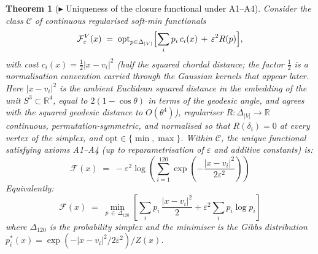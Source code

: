 \documentclass[12pt]{article}
\newtheorem{theorem}{Theorem}
\newcommand{\Fcal}{\mathcal{F}}
\begin{document}
\begin{theorem}[$\blacktriangleright$ Uniqueness of the closure functional under A1--A4]\label{thm:F}
Consider the class $\mathcal{C}$ of continuous regularised soft-min
functionals
\begin{equation}\label{eq:softmin_class}
    \Fcal_\varepsilon^V(x) \;=\; \mathrm{opt}_{p \in \Delta_{|V|}}
    \Bigl[\sum_i p_i\,c_i(x) \,+\, \varepsilon^2 R(p)\Bigr],
\end{equation}
with cost $c_i(x) = \tfrac{1}{2}|x - v_i|^2$ (half the squared chordal distance; the factor $\tfrac{1}{2}$ is a normalisation convention carried through the Gaussian kernels that appear later. Here $|x - v_i|^2$ is the ambient Euclidean squared distance in the embedding of the unit $S^3 \subset \mathbb{R}^4$, equal to $2(1-\cos\theta)$ in terms of the geodesic angle, and agrees with the squared geodesic distance to $O(\theta^4)$), regulariser $R :
\Delta_{|V|} \to \mathbb{R}$ continuous, permutation-symmetric, and
normalised so that $R(\delta_i) = 0$ at every vertex of the simplex,
and $\mathrm{opt} \in \{\min, \max\}$. Within $\mathcal{C}$, the
unique functional satisfying axioms A1--A4 (up to reparametrisation of
$\varepsilon$ and additive constants) is:
\begin{equation}\label{eq:F}
    \Fcal(x) \;=\; -\varepsilon^2\log\!\left(\sum_{i=1}^{120}
    \exp\!\left(-\frac{|x - v_i|^2}{2\varepsilon^2}\right)\right)
\end{equation}
Equivalently:
\begin{equation}\label{eq:F_var}
    \Fcal(x) \;=\; \min_{p\,\in\,\Delta_{120}}\left[
    \sum_i p_i\,\frac{|x - v_i|^2}{2} + \varepsilon^2\sum_i p_i\log p_i
    \right]
\end{equation}
where $\Delta_{120}$ is the probability simplex and the minimiser is the
Gibbs distribution $p_i^*(x) = \exp(-|x - v_i|^2/2\varepsilon^2) /
Z(x)$.
\end{theorem}
\end{document}
